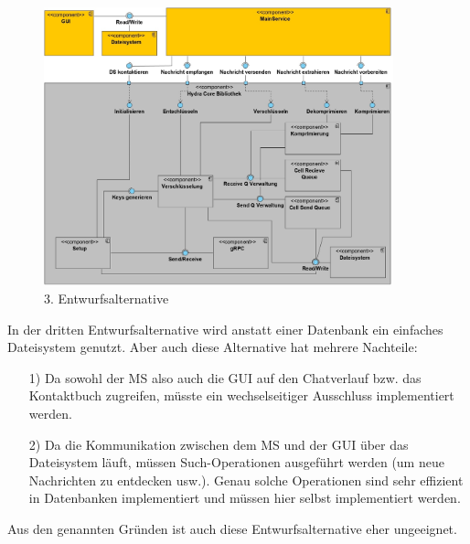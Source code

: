 \begin{figure}[h]
  \centering
     \includegraphics[width=0.9\textwidth]{diagramme/Component_Diagram_E4.jpg}
  \caption{3. Entwurfsalternative}
  \label{fig:Bild4}
\end{figure}

In der dritten Entwurfsalternative wird anstatt einer Datenbank ein einfaches Dateisystem genutzt. Aber auch diese Alternative hat mehrere Nachteile:
\begin{itemize}
\item[1)]Da sowohl der \ac{MS} also auch die \ac{GUI} auf den Chatverlauf bzw. das Kontaktbuch zugreifen, müsste ein wechselseitiger Ausschluss implementiert werden. 
\item[2)]Da die Kommunikation zwischen dem \ac{MS} und der \ac{GUI} über das Dateisystem läuft, müssen Such-Operationen ausgeführt werden (um neue Nachrichten zu entdecken usw.). Genau solche Operationen sind sehr effizient in Datenbanken implementiert und müssen hier selbst implementiert werden. 
\end{itemize}

Aus den genannten Gründen ist auch diese Entwurfsalternative eher ungeeignet.
